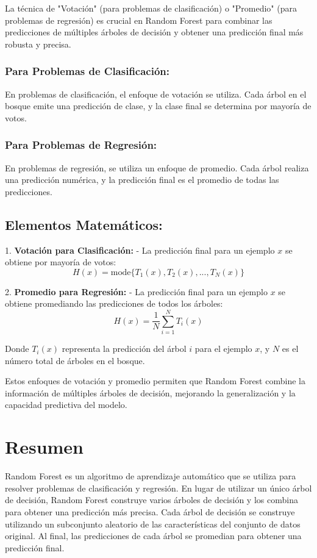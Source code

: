 \documentclass{article}
\begin{document}
La técnica de "Votación" (para problemas de clasificación) o "Promedio" (para problemas de regresión) es crucial en Random Forest para combinar las predicciones de múltiples árboles de decisión y obtener una predicción final más robusta y precisa.

\subsubsection{Para Problemas de Clasificación:}

En problemas de clasificación, el enfoque de votación se utiliza. Cada árbol en el bosque emite una predicción de clase, y la clase final se determina por mayoría de votos.

\subsubsection{Para Problemas de Regresión:}

En problemas de regresión, se utiliza un enfoque de promedio. Cada árbol realiza una predicción numérica, y la predicción final es el promedio de todas las predicciones.

\subsection{Elementos Matemáticos:}

1. \textbf{Votación para Clasificación:}
    - La predicción final para un ejemplo \(x\) se obtiene por mayoría de votos:
        \[ H(x) = \textrm{mode}\{T_1(x), T_2(x), ..., T_N(x)\} \]

2. \textbf{Promedio para Regresión:}
    - La predicción final para un ejemplo \(x\) se obtiene promediando las predicciones de todos los árboles:
        \[ H(x) = \frac{1}{N}\sum_{i=1}^{N} T_i(x) \]

Donde \(T_i(x)\) representa la predicción del árbol \(i\) para el ejemplo \(x\), y \(N\) es el número total de árboles en el bosque.

Estos enfoques de votación y promedio permiten que Random Forest combine la información de múltiples árboles de decisión, mejorando la generalización y la capacidad predictiva del modelo.

\section{Resumen}

Random Forest es un algoritmo de aprendizaje automático que se utiliza para resolver problemas de clasificación y regresión. En lugar de utilizar un único árbol de decisión, Random Forest construye varios árboles de decisión y los combina para obtener una predicción más precisa. Cada árbol de decisión se construye utilizando un subconjunto aleatorio de las características del conjunto de datos original. Al final, las predicciones de cada árbol se promedian para obtener una predicción final.
\end{document}

